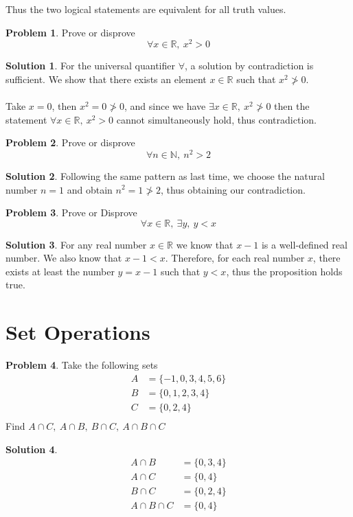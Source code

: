 \documentclass[a4paper]{article}
\theoremstyle{definition}
\newtheorem{problem}{Problem}[section]
\newtheorem*{solution}{Solution}
\begin{document}
Thus the two logical statements are equivalent for all truth values.
\newpage
\begin{problem}
Prove or disprove
\[
\forall x \in \mathbb{R}, \ x^2 > 0
\]
\end{problem}
\begin{solution}
For the universal quantifier \(\forall\), a solution by contradiction is sufficient. We show that there exists an element \(x \in \mathbb{R}\) such that \(x^2 \ngtr 0\). 
\\ \\
Take \(x = 0\), then \(x^2 = 0 \ngtr 0\), and since we have \(\exists x \in \mathbb{R} , \ x^2 \ngtr 0\) then the statement \(\forall x \in \mathbb{R}, \ x^2 > 0\) cannot simultaneously hold, thus contradiction.
\end{solution}

\begin{problem}
Prove or disprove
\[
\forall n \in \mathbb{N}, \ n^2 > 2
\]
\end{problem}
\begin{solution}
Following the same pattern as last time, we choose the natural number \(n=1\) and obtain \(n^2 = 1 \ngtr 2\), thus obtaining our contradiction.
\end{solution}

\begin{problem} Prove or Disprove
\[
\forall x \in \mathbb{R}, \ \exists y, \ y< x
\]
\end{problem}
\begin{solution}
For any real number \(x \in \mathbb{R}\) we know that \(x-1\) is a well-defined real number. We also know that \(x-1 < x\). Therefore, for each real number \(x\), there exists at least the number \(y = x-1\) such that \(y < x\), thus the proposition holds true.
\end{solution}

\section{Set Operations}
\begin{problem}
Take the following sets
\begin{align*}
A &= \{-1, 0, 3, 4, 5, 6\} \\
B &= \{0, 1, 2, 3, 4\} \\
C &= \{0,2,4\} \\ 
\end{align*}
Find
\(A \cap C, \ A \cap B,  \ B \cap C, \ A \cap B \cap C\)
\end{problem}
\begin{solution}
\begin{align*}
A \cap B &= \{0,3,4\} \\
A \cap C &= \{0,4\} \\
B \cap C &= \{0,2,4\} \\
A \cap B \cap C &= \{0, 4\}
\end{align*}
\end{solution}
\end{document}
